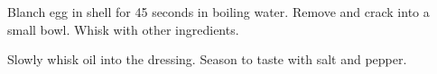\begin{recipe}
Blanch egg in shell for 45 seconds in boiling water. Remove and crack into a small bowl. Whisk with other ingredients.


Slowly whisk oil into the dressing. Season to taste with salt and pepper.

\end{recipe}

